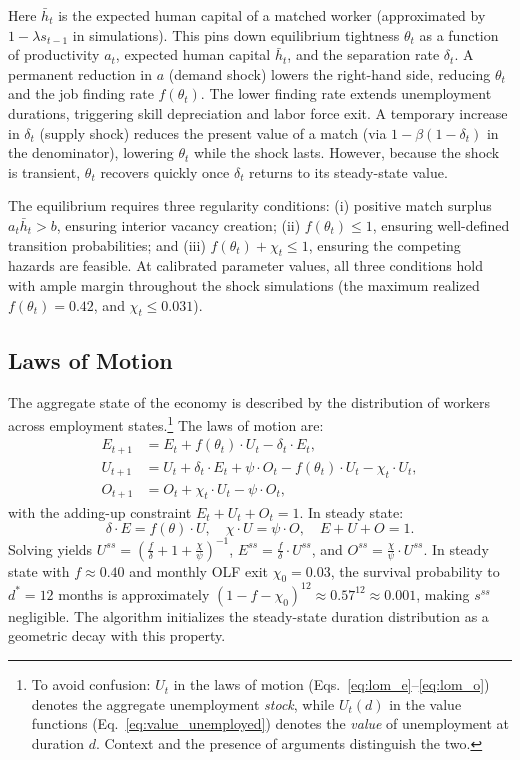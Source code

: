 \documentclass[12pt]{article}
\begin{document}
Here $\bar{h}_t$ is the expected human capital of a matched worker (approximated by $1 - \lambda s_{t-1}$ in simulations). This pins down equilibrium tightness $\theta_t$ as a function of productivity $a_t$, expected human capital $\bar{h}_t$, and the separation rate $\delta_t$. A permanent reduction in $a$ (demand shock) lowers the right-hand side, reducing $\theta_t$ and the job finding rate $f(\theta_t)$. The lower finding rate extends unemployment durations, triggering skill depreciation and labor force exit. A temporary increase in $\delta_t$ (supply shock) reduces the present value of a match (via $1 - \beta(1-\delta_t)$ in the denominator), lowering $\theta_t$ while the shock lasts. However, because the shock is transient, $\theta_t$ recovers quickly once $\delta_t$ returns to its steady-state value.

The equilibrium requires three regularity conditions: (i) positive match surplus $a_t \bar{h}_t > b$, ensuring interior vacancy creation; (ii) $f(\theta_t) \leq 1$, ensuring well-defined transition probabilities; and (iii) $f(\theta_t) + \chi_t \leq 1$, ensuring the competing hazards are feasible. At calibrated parameter values, all three conditions hold with ample margin throughout the shock simulations (the maximum realized $f(\theta_t) = 0.42$, and $\chi_t \leq 0.031$).

\subsection{Laws of Motion}

The aggregate state of the economy is described by the distribution of workers across employment states.\footnote{To avoid confusion: $U_t$ in the laws of motion (Eqs.~\ref{eq:lom_e}--\ref{eq:lom_o}) denotes the aggregate unemployment \textit{stock}, while $U_t(d)$ in the value functions (Eq.~\ref{eq:value_unemployed}) denotes the \textit{value} of unemployment at duration $d$. Context and the presence of arguments distinguish the two.} The laws of motion are:
\begin{align}
E_{t+1} &= E_t + f(\theta_t) \cdot U_t - \delta_t \cdot E_t, \label{eq:lom_e} \\
U_{t+1} &= U_t + \delta_t \cdot E_t + \psi \cdot O_t - f(\theta_t) \cdot U_t - \chi_t \cdot U_t, \label{eq:lom_u} \\
O_{t+1} &= O_t + \chi_t \cdot U_t - \psi \cdot O_t, \label{eq:lom_o}
\end{align}
with the adding-up constraint $E_t + U_t + O_t = 1$. In steady state:
\begin{equation}
\delta \cdot E = f(\theta) \cdot U, \quad \chi \cdot U = \psi \cdot O, \quad E + U + O = 1.
\label{eq:steadystate}
\end{equation}
Solving yields $U^{ss} = \left( \frac{f}{\delta} + 1 + \frac{\chi}{\psi} \right)^{-1}$, $E^{ss} = \frac{f}{\delta} \cdot U^{ss}$, and $O^{ss} = \frac{\chi}{\psi} \cdot U^{ss}$. In steady state with $f \approx 0.40$ and monthly OLF exit $\chi_0 = 0.03$, the survival probability to $d^* = 12$ months is approximately $(1 - f - \chi_0)^{12} \approx 0.57^{12} \approx 0.001$, making $s^{ss}$ negligible. The algorithm initializes the steady-state duration distribution as a geometric decay with this property.
\end{document}
